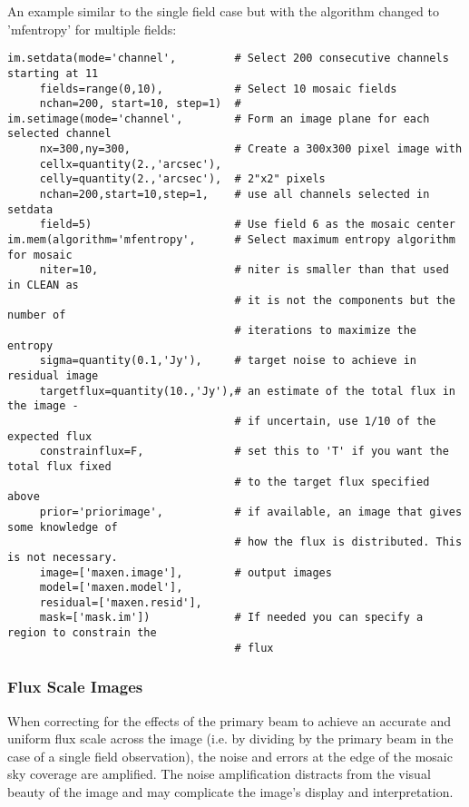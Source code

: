 An example similar to the single field case but with the algorithm
changed to 'mfentropy' for multiple fields:


\small
\begin{verbatim}
im.setdata(mode='channel',         # Select 200 consecutive channels starting at 11
     fields=range(0,10),           # Select 10 mosaic fields
     nchan=200, start=10, step=1)  #
im.setimage(mode='channel',        # Form an image plane for each selected channel
     nx=300,ny=300,                # Create a 300x300 pixel image with
     cellx=quantity(2.,'arcsec'),
     celly=quantity(2.,'arcsec'),  # 2"x2" pixels
     nchan=200,start=10,step=1,    # use all channels selected in setdata
     field=5)                      # Use field 6 as the mosaic center
im.mem(algorithm='mfentropy',      # Select maximum entropy algorithm for mosaic
     niter=10,                     # niter is smaller than that used in CLEAN as
                                   # it is not the components but the number of
                                   # iterations to maximize the entropy
     sigma=quantity(0.1,'Jy'),     # target noise to achieve in residual image
     targetflux=quantity(10.,'Jy'),# an estimate of the total flux in the image -
                                   # if uncertain, use 1/10 of the expected flux
     constrainflux=F,              # set this to 'T' if you want the total flux fixed
                                   # to the target flux specified above
     prior='priorimage',           # if available, an image that gives some knowledge of
                                   # how the flux is distributed. This is not necessary.
     image=['maxen.image'],        # output images
     model=['maxen.model'],
     residual=['maxen.resid'],
     mask=['mask.im'])             # If needed you can specify a region to constrain the
                                   # flux
\end{verbatim}
\normalsize 


\subsubsection{Flux Scale Images}
\label{section:imtool.mosaic.details.fluxscale}

When correcting for the effects of the primary beam to achieve an
accurate and uniform flux scale across the image (i.e.  by dividing by
the primary beam in the case of a single field observation), the noise
and errors at the edge of the mosaic sky coverage are amplified.  The
noise amplification distracts from the visual beauty of the image and
may complicate the image's display and interpretation.

